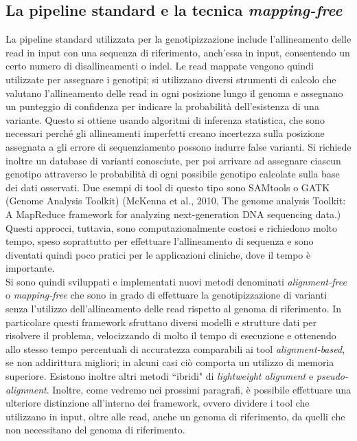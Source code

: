 \documentclass[../main.tex]{subfiles}
\begin{document}
\subsection{La pipeline standard e la tecnica \textit{mapping-free}}


La pipeline standard utilizzata per la genotipizzazione include l'allineamento delle read in input con una sequenza di riferimento, anch'essa in input, consentendo un certo numero di disallineamenti o indel. Le read mappate vengono quindi utilizzate per assegnare i genotipi; si utilizzano diversi strumenti di calcolo che valutano l'allineamento delle read in ogni posizione lungo il genoma e assegnano un punteggio di confidenza per indicare la probabilità dell'esistenza di una variante. Questo si ottiene usando algoritmi di inferenza statistica, che sono necessari perché gli allineamenti imperfetti creano incertezza sulla posizione assegnata a gli errore di sequenziamento possono indurre false varianti. Si richiede inoltre un database di varianti conosciute, per poi arrivare ad assegnare ciascun genotipo attraverso le probabilità di ogni possibile genotipo calcolate sulla base dei dati osservati. Due esempi di tool di questo tipo sono  SAMtools o GATK (Genome Analysis Toolkit) (McKenna et al., 2010, The genome analysis Toolkit: A MapReduce framework for
analyzing next-generation DNA sequencing data.) Questi approcci, tuttavia, sono computazionalmente costosi e richiedono molto tempo, speso soprattutto per effettuare l'allineamento di sequenza e sono diventati quindi poco pratici per le applicazioni cliniche, dove il tempo è importante. \\


Si sono quindi sviluppati e implementati nuovi metodi denominati \textit{alignment-free} o \textit{mapping-free} che sono in grado di effettuare la genotipizzazione di varianti senza l'utilizzo dell'allineamento delle read rispetto al genoma di riferimento. In particolare questi framework sfruttano diversi modelli e strutture dati per risolvere il problema, velocizzando di molto il tempo di esecuzione e ottenendo allo stesso tempo percentuali di accuratezza comparabili ai tool \textit{alignment-based}, se non addirittura migliori; in alcuni casi ciò comporta un utilizzo di memoria superiore. Esistono inoltre altri metodi ``ibridi" di \textit{lightweight alignment} e \textit{pseudo-alignment}. Inoltre, come vedremo nei prossimi paragrafi, è possibile effettuare una ulteriore distinzione all'interno dei framework, ovvero dividere i tool che utilizzano in input, oltre alle read, anche un genoma di riferimento, da quelli che non necessitano del genoma di riferimento. 
\end{document}
